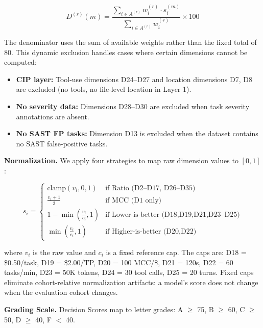 \documentclass[10pt,twocolumn]{article}
\begin{document}
\begin{equation}
D^{(r)}(m) = \frac{\displaystyle\sum_{i \in A^{(r)}} w_i^{(r)} \cdot s_i^{(m)}}{\displaystyle\sum_{i \in A^{(r)}} w_i^{(r)}} \times 100
\label{eq:decision_score}
\end{equation}

The denominator uses the sum of available weights rather than the fixed total of 80. This dynamic exclusion handles cases where certain dimensions cannot be computed:

\begin{itemize}[noitemsep,topsep=2pt]
    \item \textbf{CIP layer:} Tool-use dimensions D24--D27 and location dimensions D7, D8 are excluded (no tools, no file-level location in Layer 1).
    \item \textbf{No severity data:} Dimensions D28--D30 are excluded when task severity annotations are absent.
    \item \textbf{No SAST FP tasks:} Dimension D13 is excluded when the dataset contains no SAST false-positive tasks.
\end{itemize}

\textbf{Normalization.} We apply four strategies to map raw dimension values to $[0, 1]$:

\begin{equation}
s_i = \begin{cases}
\text{clamp}(v_i, 0, 1) & \text{if Ratio (D2--D17, D26--D35)} \\[4pt]
\frac{v_i + 1}{2} & \text{if MCC (D1 only)} \\[4pt]
1 - \min\!\left(\frac{v_i}{c_i}, 1\right) & \text{if Lower-is-better (D18,D19,D21,D23--D25)} \\[4pt]
\min\!\left(\frac{v_i}{c_i}, 1\right) & \text{if Higher-is-better (D20,D22)}
\end{cases}
\label{eq:normalization}
\end{equation}

where $v_i$ is the raw value and $c_i$ is a fixed reference cap. The caps are: D18 = \$0.50/task, D19 = \$2.00/TP, D20 = 100 MCC/\$, D21 = 120s, D22 = 60 tasks/min, D23 = 50K tokens, D24 = 30 tool calls, D25 = 20 turns. Fixed caps eliminate cohort-relative normalization artifacts: a model's score does not change when the evaluation cohort changes.

\textbf{Grading Scale.} Decision Scores map to letter grades: A $\geq$ 75, B $\geq$ 60, C $\geq$ 50, D $\geq$ 40, F $<$ 40.

\end{document}
